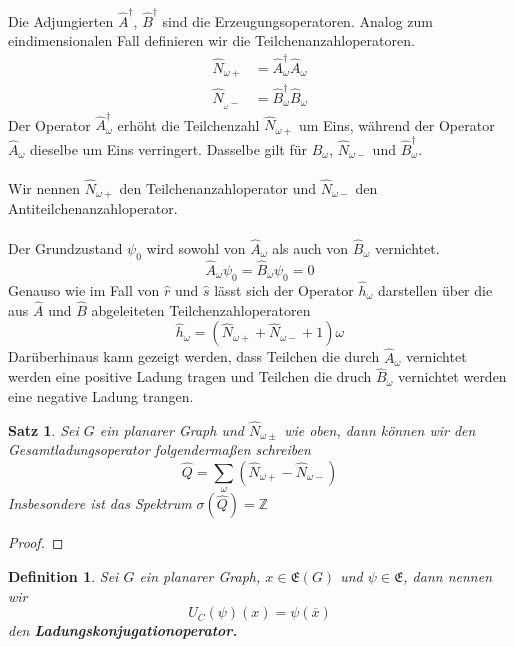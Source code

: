 \documentclass[11pt,a4paper,leqno]{report}
\newtheorem{proposition}{Satz}[chapter]
\newtheorem{definition}[theorem]{Definition}
\numberwithin{equation}{chapter}
\begin{document}
Die Adjungierten $\hat{A}^\dagger$, $\hat{B}^\dagger$ sind die Erzeugungsoperatoren. Analog zum eindimensionalen Fall definieren wir die Teilchenanzahloperatoren.
\begin{align*}
	\hat{N}_{\omega +} &= \hat{A}_\omega^\dagger \hat{A}_\omega\\
	\hat{N}_{_\omega -} &= \hat{B}_\omega^\dagger \hat{B}_\omega
\end{align*}
Der Operator $\hat{A}_\omega^\dagger$ erh\"oht die Teilchenzahl $\hat{N}_{\omega +}$ um Eins, während der Operator $\hat{A}_\omega$ dieselbe um Eins verringert. Dasselbe gilt f\"ur $\hat{B}_\omega$, $\hat{N}_{\omega -}$ und $\hat{B}_\omega^\dagger$.\\
\\
Wir nennen $\hat{N}_{\omega +}$ den Teilchenanzahloperator und $\hat{N}_{\omega -}$ den Antiteilchenanzahloperator.\\
\\
Der Grundzustand $\psi_0$ wird sowohl von $\hat{A}_\omega$ als auch von $\hat{B}_\omega$ vernichtet. 
\begin{equation*}
	\hat{A}_\omega\psi_0 = \hat{B}_\omega\psi_0 = 0
\end{equation*}
Genauso wie im Fall von $\hat{r}$ und $\hat{s}$ l\"asst sich der Operator $\hat{h}_\omega$ darstellen \"uber die aus $\hat{A}$ und $\hat{B}$ abgeleiteten Teilchenzahloperatoren
\begin{equation*}
	\hat{h}_\omega = (\hat{N}_{\omega +} +\hat{N}_{\omega -} + 1)\omega
\end{equation*}
Dar\"uberhinaus kann gezeigt werden, dass Teilchen die durch $\hat{A}_\omega$ vernichtet werden eine positive Ladung tragen und Teilchen die druch $\hat{B}_\omega$ vernichtet werden eine negative Ladung trangen.
\begin{proposition}
	Sei $G$ ein planarer Graph und $\hat{N}_{\omega\pm}$ wie oben, dann k\"onnen wir den Gesamtladungsoperator folgenderma\ss{}en schreiben
	\begin{equation*}
		\hat{Q} = \sum_\omega(\hat{N}_{\omega +} -\hat{N}_{\omega -
		})
	\end{equation*}
	Insbesondere ist das Spektrum $\sigma(\hat{Q})=\mathbb{Z}$
\end{proposition}
\begin{proof}
	
\end{proof}
\begin{definition}
	Sei $G$ ein planarer Graph, $x\in \mathfrak{E}(G)$ und $\psi\in\mathfrak{E}$, dann nennen wir
	\begin{equation}
		U_C(\psi)(x) =\psi(\overline{x})
	\end{equation}
	den \textbf{Ladungskonjugationoperator.}
\end{definition}
\end{document}
